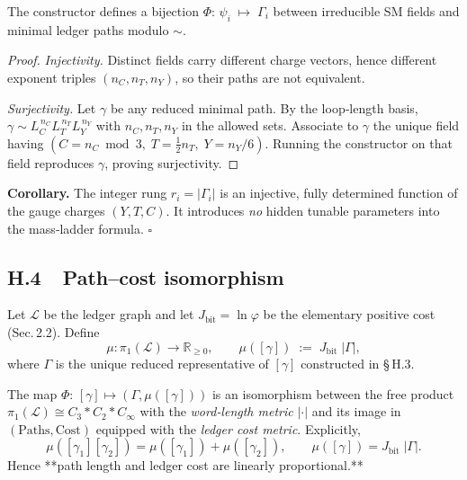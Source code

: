 \begin{theorem}
The constructor defines a bijection
\(
  \Phi:\,
  \psi_i \;\longmapsto\; \Gamma_i
\)
between irreducible SM fields and minimal ledger paths
modulo $\sim$.
\end{theorem}

\begin{proof}
\emph{Injectivity.}  
Distinct fields carry different charge vectors, hence
different exponent triples $(n_C,n_T,n_Y)$, so their
paths are not equivalent.

\emph{Surjectivity.}  
Let $\gamma$ be any reduced minimal path.
By the loop‑length basis,
$\gamma\!\sim\!L_C^{\,n_C}L_T^{\,n_T}L_Y^{\,n_Y}$ with
$n_C,n_T,n_Y$ in the allowed sets.
Associate to $\gamma$ the unique field having
$(C=n_C\bmod3,\;T=\tfrac12 n_T,\;Y=n_Y/6)$.
Running the constructor on that field reproduces
$\gamma$, proving surjectivity.
\end{proof}

\bigskip
\noindent
\textbf{Corollary.}\;
The integer rung
$r_i=|\Gamma_i|$ is an injective, fully determined
function of the gauge charges $(Y,T,C)$.
It introduces \emph{no} hidden tunable
parameters into the mass‑ladder formula.
\hfill$\square$

\subsection*{H.4  Path–cost isomorphism}
\begin{definition}\label{def:measure}
Let $\mathscr L$ be the ledger graph and let
$J_{\text{bit}}=\ln\varphi$ be the elementary positive cost
(Sec.\,2.2).  Define
\[
  \mu:\pi_1(\mathscr L)\longrightarrow\mathbb R_{\ge0},
  \qquad
  \mu([\gamma])\;:=\;J_{\text{bit}}\;\bigl|\Gamma\bigr|,
\]
where $\Gamma$ is the unique reduced representative of $[\gamma]$
constructed in § H.3.
\end{definition}

\begin{theorem}\label{thm:isom}
The map
\(
  \Phi:\,[\gamma]\mapsto(\Gamma,\mu([\gamma]))
\)
is an isomorphism between the free product
$\pi_1(\mathscr L)\cong C_3\!*C_2\!*C_\infty$
with the \emph{word‑length metric} $|\cdot|$
and its image in
$(\text{Paths},\text{Cost})$
equipped with the \emph{ledger cost metric}.  
Explicitly,
\[
  \mu([\gamma_1][\gamma_2])
   = \mu([\gamma_1])+\mu([\gamma_2]),
  \qquad
  \mu([\gamma]) = J_{\text{bit}}\;|\Gamma|.
\]
Hence **path length and ledger cost are linearly proportional.**
\end{theorem}

